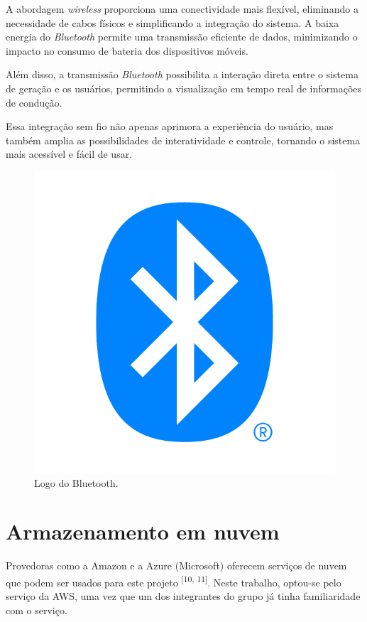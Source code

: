A abordagem \textit{wireless} proporciona uma conectividade mais flexível, eliminando a necessidade de cabos físicos e simplificando a integração do sistema. A baixa energia do \textit{Bluetooth} permite uma transmissão eficiente de dados, minimizando o impacto no consumo de bateria dos dispositivos móveis.

Além disso, a transmissão \textit{Bluetooth} possibilita a interação direta entre o sistema de geração e os usuários, permitindo a visualização em tempo real de informações de condução.

Essa integração sem fio não apenas aprimora a experiência do usuário, mas também amplia as possibilidades de interatividade e controle, tornando o sistema mais acessível e fácil de usar.

 \begin{figure}[hp]
    \centering
    
    \includegraphics[scale=0.4]{figures/bluetooth.png}
    
    \caption{Logo do Bluetooth.}
    
\end{figure}

\section{Armazenamento em nuvem}
Provedoras como a Amazon e a Azure (Microsoft) oferecem serviços de nuvem que podem ser usados para este projeto \textsuperscript{[10, 11]}. Neste trabalho, optou-se pelo serviço da AWS, uma vez que um dos integrantes do grupo já tinha familiaridade com o serviço.

